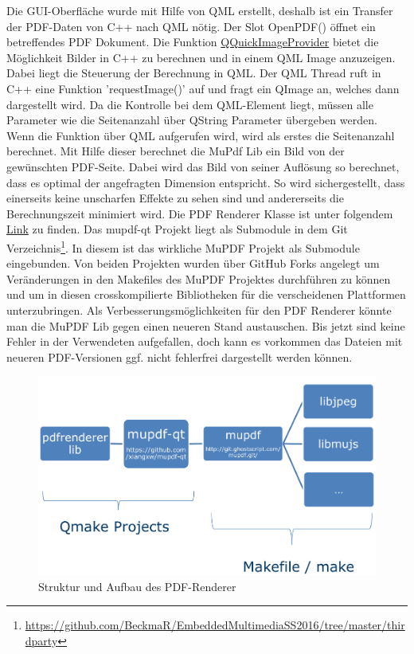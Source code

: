 Die GUI-Oberfläche wurde mit Hilfe von QML erstellt, deshalb ist ein Transfer der PDF-Daten von C++ nach QML nötig. Der Slot OpenPDF() öffnet ein betreffendes PDF Dokument. Die Funktion \href{http://doc.qt.io/qt-5/qquickimageprovider.html}{QQuickImageProvider} bietet die Möglichkeit Bilder in C++ zu berechnen und in einem QML Image anzuzeigen. Dabei liegt die Steuerung der Berechnung in QML. Der QML Thread ruft in C++ eine Funktion 'requestImage()' auf und fragt ein QImage an, welches dann dargestellt wird. Da die Kontrolle bei dem QML-Element liegt, müssen alle Parameter wie die Seitenanzahl über QString Parameter übergeben werden.
Wenn die Funktion über QML aufgerufen wird, wird als erstes die Seitenanzahl berechnet. Mit Hilfe dieser berechnet die MuPdf Lib ein Bild von der gewünschten PDF-Seite. Dabei wird das Bild von seiner Auflösung so berechnet, dass es optimal der angefragten Dimension entspricht. So wird sichergestellt, dass einerseits keine unscharfen Effekte zu sehen sind und andererseits die Berechnungszeit minimiert wird.
Die PDF Renderer Klasse ist unter folgendem \href{https://github.com/BeckmaR/EmbeddedMultimediaSS2016/tree/master/src/pdfrenderer}{Link} zu finden. Das mupdf-qt Projekt liegt als Submodule in dem Git Verzeichnis\footnote{\url{https://github.com/BeckmaR/EmbeddedMultimediaSS2016/tree/master/thirdparty}}. In diesem ist das wirkliche MuPDF Projekt als Submodule eingebunden. Von beiden Projekten wurden über GitHub Forks angelegt um Veränderungen in den Makefiles des MuPDF Projektes durchführen zu können und um in diesen crosskompilierte Bibliotheken für die verscheidenen Plattformen unterzubringen.
Als Verbesserungsmöglichkeiten für den PDF Renderer könnte man die MuPDF Lib gegen einen neueren Stand austauschen. Bis jetzt sind keine Fehler in der Verwendeten aufgefallen, doch kann es vorkommen das Dateien mit neueren PDF-Versionen ggf. nicht fehlerfrei dargestellt werden können.

\begin{figure}[ht!]
\centering
\includegraphics[angle=0,width=14cm]{PdfRenderer/pdfrenderer_aufbau.png}
\caption{Struktur und Aufbau des PDF-Renderer}
\end{figure}


 

